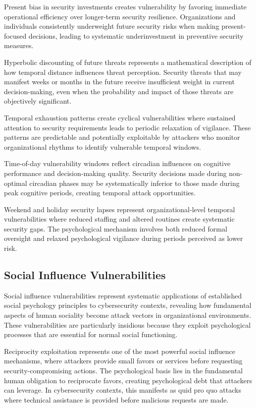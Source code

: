 \documentclass[11pt,a4paper]{article}
\begin{document}
Present bias in security investments creates vulnerability by favoring immediate operational efficiency over longer-term security resilience. Organizations and individuals consistently underweight future security risks when making present-focused decisions, leading to systematic underinvestment in preventive security measures.

Hyperbolic discounting of future threats represents a mathematical description of how temporal distance influences threat perception. Security threats that may manifest weeks or months in the future receive insufficient weight in current decision-making, even when the probability and impact of those threats are objectively significant.

Temporal exhaustion patterns create cyclical vulnerabilities where sustained attention to security requirements leads to periodic relaxation of vigilance. These patterns are predictable and potentially exploitable by attackers who monitor organizational rhythms to identify vulnerable temporal windows.

Time-of-day vulnerability windows reflect circadian influences on cognitive performance and decision-making quality. Security decisions made during non-optimal circadian phases may be systematically inferior to those made during peak cognitive periods, creating temporal attack opportunities.

Weekend and holiday security lapses represent organizational-level temporal vulnerabilities where reduced staffing and altered routines create systematic security gaps. The psychological mechanism involves both reduced formal oversight and relaxed psychological vigilance during periods perceived as lower risk.

\subsection{Social Influence Vulnerabilities}

Social influence vulnerabilities represent systematic applications of established social psychology principles to cybersecurity contexts, revealing how fundamental aspects of human sociality become attack vectors in organizational environments. These vulnerabilities are particularly insidious because they exploit psychological processes that are essential for normal social functioning.

Reciprocity exploitation represents one of the most powerful social influence mechanisms, where attackers provide small favors or services before requesting security-compromising actions. The psychological basis lies in the fundamental human obligation to reciprocate favors, creating psychological debt that attackers can leverage. In cybersecurity contexts, this manifests as quid pro quo attacks where technical assistance is provided before malicious requests are made.
\end{document}
